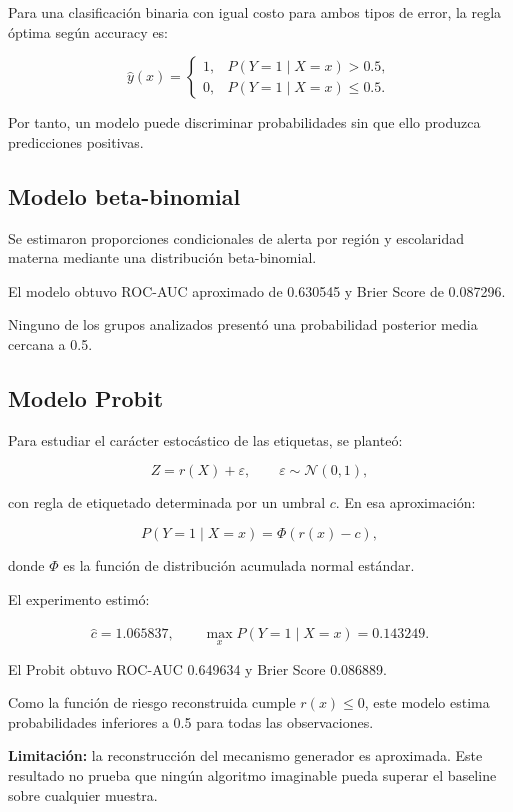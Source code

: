 ﻿\documentclass[11pt,a4paper]{article}
\begin{document}
Para una clasificación binaria con igual costo
para ambos tipos de error, la regla óptima
según accuracy es:

\[
\widehat y(x)=
\begin{cases}
1,&P(Y=1\mid X=x)>0.5,\\
0,&P(Y=1\mid X=x)\leq0.5.
\end{cases}
\]

Por tanto, un modelo puede discriminar probabilidades
sin que ello produzca predicciones positivas.

\subsection{Modelo beta-binomial}

Se estimaron proporciones condicionales de alerta
por región y escolaridad materna mediante
una distribución beta-binomial.

El modelo obtuvo ROC-AUC aproximado de 0.630545
y Brier Score de 0.087296.

Ninguno de los grupos analizados presentó
una probabilidad posterior media cercana a 0.5.

\subsection{Modelo Probit}

Para estudiar el carácter estocástico de las
etiquetas, se planteó:

\[
Z=r(X)+\varepsilon,
\qquad
\varepsilon\sim\mathcal N(0,1),
\]

con regla de etiquetado determinada por un umbral
\(c\). En esa aproximación:

\[
P(Y=1\mid X=x)=\Phi(r(x)-c),
\]

donde \(\Phi\) es la función de distribución
acumulada normal estándar.

El experimento estimó:

\[
\widehat c=1.065837,
\qquad
\max_x\widehat P(Y=1\mid X=x)=0.143249.
\]

El Probit obtuvo ROC-AUC 0.649634 y
Brier Score 0.086889.

Como la función de riesgo reconstruida cumple
\(r(x)\leq0\), este modelo estima probabilidades
inferiores a 0.5 para todas las observaciones.

\textbf{Limitación:} la reconstrucción del mecanismo
generador es aproximada. Este resultado no prueba
que ningún algoritmo imaginable pueda superar
el baseline sobre cualquier muestra.
\end{document}
